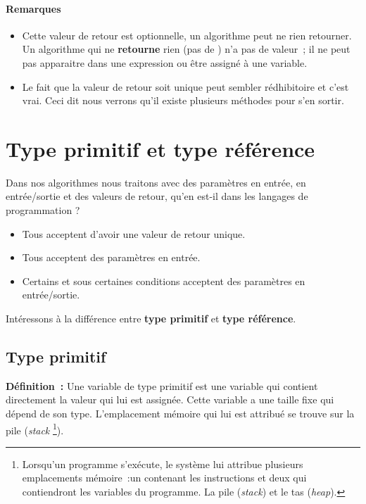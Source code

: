 		\paragraph{Remarques} 
		\begin{itemize}
			
			\item Cette valeur de retour est optionnelle, un algorithme peut ne
				rien retourner.  Un algorithme qui ne \textbf{retourne} rien
				(pas de \Gives) n’a pas de valeur~; il ne peut pas apparaitre
				dans une expression ou être assigné à une variable.  

			\item Le fait que la valeur de retour soit unique peut sembler
				rédhibitoire et c'est vrai. Ceci dit nous verrons qu'il existe
				plusieurs méthodes pour s'en sortir.
		
		\end{itemize}
		



\section{Type primitif et type référence}
	\label{primitif-reference}

	Dans nos algorithmes nous traitons avec des paramètres en entrée, en
	entrée/sortie et des valeurs de retour, qu'en est-il dans les langages de
	programmation ? 

	\begin{itemize}
		\item Tous acceptent d'avoir une valeur de retour unique.
		\item Tous acceptent des paramètres en entrée. 
		\item Certains et sous certaines conditions acceptent des paramètres en 
			entrée/sortie.
	\end{itemize}

	Intéressons à la différence entre \textbf{type primitif} et \textbf{type
	référence}.

	\pagebreak
	\subsection{Type primitif}

	\label{variable}
	\textbf{Définition~:} 
	Une variable de type primitif est une variable qui contient directement la
	valeur qui lui est assignée.  Cette variable a une taille fixe qui dépend de
	son type. L'emplacement mémoire qui lui est attribué se trouve sur la pile
	(\textit{stack}
	\footnote{%
		Lorsqu'un programme s'exécute, le système lui attribue plusieurs
		emplacements mémoire~:un contenant les instructions et deux qui
		contiendront les variables du programme. La pile (\textit{stack}) et le
		tas (\textit{heap}).  
	}).
	
